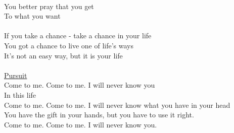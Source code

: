 \documentclass[11pt]{article}
\begin{document}
\\
You better pray that you get\\
To what you want\\
\\
If you take a chance - take a chance in your life\\
You got a chance to live one of life's ways\\
It's not an easy way, but it is your life\\
\\
\underline{Pursuit}\\
Come to me. Come to me. I will never know you\\
In this life\\
Come to me. Come to me. I will never know what you have in your head\\
You have the gift in your hands, but you have to use it right.\\
Come to me. Come to me. I will never know you.\\








\end{document}
